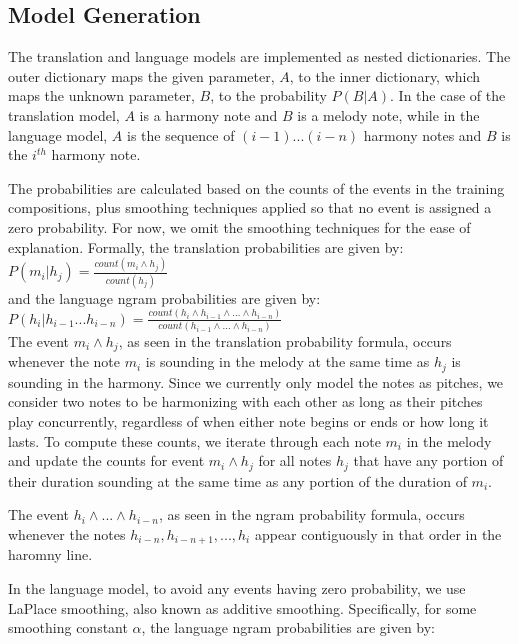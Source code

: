 \documentclass{sig-alternate}
\begin{document}
\subsection{Model Generation}
The translation and language models are implemented as nested dictionaries. The outer dictionary maps the given parameter, $A$, to the inner dictionary, which maps the unknown parameter, $B$, to the probability $P(B | A)$. In the case of the translation model, $A$ is a harmony note and $B$ is a melody note, while in the language model, $A$ is the sequence of $(i - 1) ... (i - n)$ harmony notes and $B$ is the $i^{th}$ harmony note.

The probabilities are calculated based on the counts of the events in the training compositions, plus smoothing techniques applied so that no event is assigned a zero probability. For now, we omit the smoothing techniques for the ease of explanation. Formally, the translation probabilities are given by:\\

$P(m_{i} | h_{j}) = \frac{count(m_{i} \wedge h_{j})}{count(h_{j})}$\\

and the language ngram probabilities are given by: \\

$P(h_{i} | h_{i - 1} ... h_{i - n}) = \frac{count(h_{i} \wedge h_{i - 1} \wedge ... \wedge h_{i - n})}{count(h_{i - 1} \wedge ... \wedge h_{i - n})}$\\

The event $m_{i} \wedge h_{j}$, as seen in the translation probability formula, occurs whenever the note $m_{i}$ is sounding in the melody at the same time as $h_{j}$ is sounding in the harmony. Since we currently only model the notes as pitches, we consider two notes to be harmonizing with each other as long as their pitches play concurrently, regardless of when either note begins or ends or how long it lasts. To compute these counts, we iterate through each note $m_{i}$ in the melody and update the counts for event $m_{i} \wedge h_{j}$ for all notes $h_{j}$ that have any portion of their duration sounding at the same time as any portion of the duration of $m_{i}$.

The event $h_{i} \wedge ... \wedge h_{i - n}$, as seen in the ngram probability formula, occurs whenever the notes $h_{i - n}, h_{i - n + 1}, ..., h_{i}$ appear contiguously in that order in the haromny line. 

In the language model, to avoid any events having zero probability, we use LaPlace smoothing, also known as additive smoothing. Specifically, for some smoothing constant $\alpha$, the language ngram probabilities are given by: \\
\end{document}
